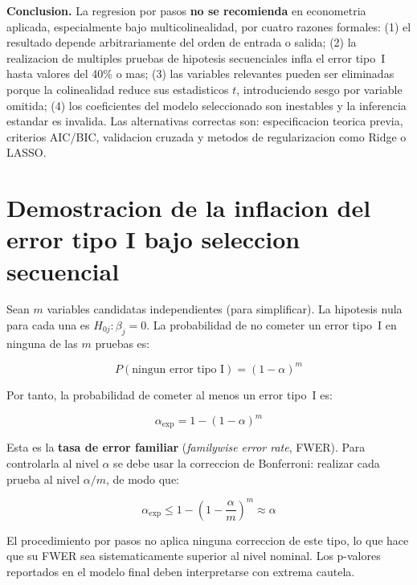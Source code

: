 \documentclass[12pt, letterpaper]{article}
\theoremstyle{remark}
\begin{document}
\begin{clave}
  \textbf{Conclusion.} La regresion por pasos \textbf{no se recomienda} en
  econometria aplicada, especialmente bajo multicolinealidad, por cuatro
  razones formales: (1) el resultado depende arbitrariamente del orden de
  entrada o salida; (2) la realizacion de multiples pruebas de hipotesis
  secuenciales infla el error tipo~I hasta valores del 40\% o mas; (3) las
  variables relevantes pueden ser eliminadas porque la colinealidad reduce
  sus estadisticos $t$, introduciendo sesgo por variable omitida; (4) los
  coeficientes del modelo seleccionado son inestables y la inferencia
  estandar es invalida. Las alternativas correctas son: especificacion
  teorica previa, criterios AIC/BIC, validacion cruzada y metodos de
  regularizacion como Ridge o LASSO.
\end{clave}

\appendix

\section{Demostracion de la inflacion del error tipo I bajo seleccion secuencial}

Sean $m$ variables candidatas independientes (para simplificar). La hipotesis
nula para cada una es $H_{0j}: \beta_j = 0$. La probabilidad de no cometer
un error tipo~I en ninguna de las $m$ pruebas es:

\begin{equation}
  P(\text{ningun error tipo I}) = (1-\alpha)^m
  \label{eq:no_error}
\end{equation}

Por tanto, la probabilidad de cometer al menos un error tipo~I es:

\begin{equation}
  \alpha_{\text{exp}} = 1 - (1-\alpha)^m
  \label{eq:alpha_exp}
\end{equation}

Esta es la \textbf{tasa de error familiar} (\textit{familywise error rate},
FWER). Para controlarla al nivel $\alpha$ se debe usar la correccion de
Bonferroni: realizar cada prueba al nivel $\alpha/m$, de modo que:

\begin{equation}
  \alpha_{\text{exp}} \leq 1 - \left(1 - \frac{\alpha}{m}\right)^m \approx \alpha
  \label{eq:bonferroni_corr}
\end{equation}

El procedimiento por pasos no aplica ninguna correccion de este tipo, lo que
hace que su FWER sea sistematicamente superior al nivel nominal. Los p-valores
reportados en el modelo final deben interpretarse con extrema cautela.
\end{document}
